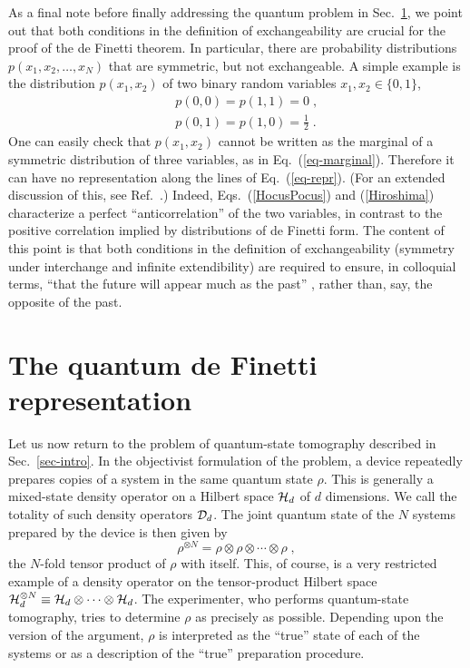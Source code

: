 As a final note before finally addressing the quantum problem in
Sec.~\ref{sec-quantum}, we point out that both conditions in the
definition of exchangeability are crucial for the proof of the de
Finetti theorem.  In particular, there are probability
distributions $p(x_1,x_2,\ldots,x_N)$ that are symmetric, but not
exchangeable.  A simple example is the distribution $p(x_1,x_2)$
of two binary random variables $x_1,x_2\in\{0,1\}$,
\begin{eqnarray}
&& p(0,0) = p(1,1) = 0\;,
\label{HocusPocus}
\\
&& p(0,1) = p(1,0) = \frac{1}{2} \;.
\label{Hiroshima}
\end{eqnarray}
One can easily check that $p(x_1,x_2)$ cannot be written as the
marginal of a symmetric distribution of three variables, as in
Eq.~(\ref{eq-marginal}). Therefore it can have no representation
along the lines of Eq.~(\ref{eq-repr}).  (For an extended
discussion of this, see Ref.~\cite{Jaynes1986}.)  Indeed,
Eqs.~(\ref{HocusPocus}) and (\ref{Hiroshima}) characterize a
perfect ``anticorrelation'' of the two variables, in contrast to
the positive correlation implied by distributions of de Finetti
form.  The content of this point is that both conditions in the
definition of exchangeability (symmetry under interchange and
infinite extendibility) are required to ensure, in colloquial
terms, ``that the future will appear much as the past''
\cite{vonPlato1989}, rather than, say, the opposite of the past.

\section{The quantum de Finetti representation} \label{sec-quantum}

Let us now return to the problem of quantum-state tomography
described in Sec.~\ref{sec-intro}. In the objectivist formulation of
the problem, a device repeatedly prepares copies of a system in the
same quantum state $\rho$. This is generally a mixed-state density
operator on a Hilbert space ${\cal H}_d$ of $d$ dimensions. We call
the totality of such density operators ${\cal D}_d$.  The joint
quantum state of the $N$ systems prepared by the device is then
given by
\begin{equation}
\rho^{\otimes N}=\rho\otimes\rho\otimes\cdots\otimes\rho \;,
\end{equation}
the $N$-fold tensor product of $\rho$ with itself. This, of
course, is a very restricted example of a density operator on the
tensor-product Hilbert space ${\cal H}_d^{\otimes N}\equiv {\cal
H}_d\otimes\cdots\otimes{\cal H}_d$. The experimenter, who
performs quantum-state tomography, tries to determine $\rho$ as
precisely as possible. Depending upon the version of the argument,
$\rho$ is interpreted as the ``true'' state of each of the systems
or as a description of the ``true'' preparation procedure.

